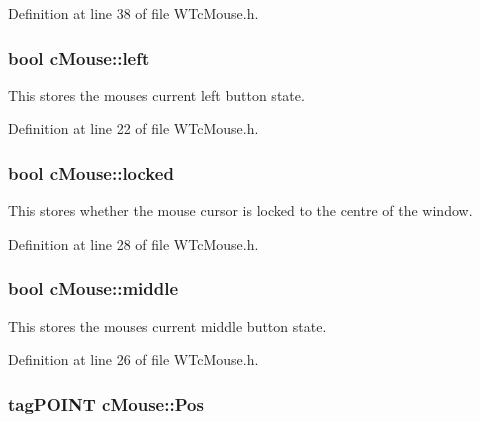 Definition at line 38 of file WTcMouse.h.

\hypertarget{classc_mouse_a377c398a74652f24dc4a0082e426fa3b}{
\subsubsection[{left}]{\setlength{\rightskip}{0pt plus 5cm}bool {\bf cMouse::left}}}
\label{classc_mouse_a377c398a74652f24dc4a0082e426fa3b}


This stores the mouses current left button state. 



Definition at line 22 of file WTcMouse.h.

\hypertarget{classc_mouse_a446e439868a0cbe7c7a34f05b1aac1ed}{
\subsubsection[{locked}]{\setlength{\rightskip}{0pt plus 5cm}bool {\bf cMouse::locked}}}
\label{classc_mouse_a446e439868a0cbe7c7a34f05b1aac1ed}


This stores whether the mouse cursor is locked to the centre of the window. 



Definition at line 28 of file WTcMouse.h.

\hypertarget{classc_mouse_a557b3b684fe0afeb1c99ea8f0e0b4225}{
\subsubsection[{middle}]{\setlength{\rightskip}{0pt plus 5cm}bool {\bf cMouse::middle}}}
\label{classc_mouse_a557b3b684fe0afeb1c99ea8f0e0b4225}


This stores the mouses current middle button state. 



Definition at line 26 of file WTcMouse.h.

\hypertarget{classc_mouse_ad6306d52aba6df1e6496c038db013442}{
\subsubsection[{Pos}]{\setlength{\rightskip}{0pt plus 5cm}tagPOINT {\bf cMouse::Pos}}}
\label{classc_mouse_ad6306d52aba6df1e6496c038db013442}


